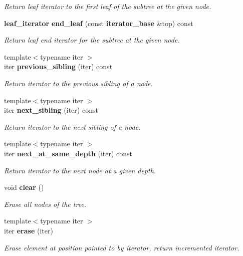 \begin{DoxyCompactItemize}
\begin{DoxyCompactList}\small\item\em Return leaf iterator to the first leaf of the subtree at the given node. \end{DoxyCompactList}\item 
{\bf leaf\+\_\+iterator} {\bf end\+\_\+leaf} (const {\bf iterator\+\_\+base} \&top) const 
\begin{DoxyCompactList}\small\item\em Return leaf end iterator for the subtree at the given node. \end{DoxyCompactList}\item 
{\footnotesize template$<$typename iter $>$ }\\iter {\bf previous\+\_\+sibling} (iter) const 
\begin{DoxyCompactList}\small\item\em Return iterator to the previous sibling of a node. \end{DoxyCompactList}\item 
{\footnotesize template$<$typename iter $>$ }\\iter {\bf next\+\_\+sibling} (iter) const 
\begin{DoxyCompactList}\small\item\em Return iterator to the next sibling of a node. \end{DoxyCompactList}\item 
{\footnotesize template$<$typename iter $>$ }\\iter {\bf next\+\_\+at\+\_\+same\+\_\+depth} (iter) const 
\begin{DoxyCompactList}\small\item\em Return iterator to the next node at a given depth. \end{DoxyCompactList}\item 
void {\bf clear} ()
\begin{DoxyCompactList}\small\item\em Erase all nodes of the tree. \end{DoxyCompactList}\item 
{\footnotesize template$<$typename iter $>$ }\\iter {\bf erase} (iter)
\begin{DoxyCompactList}\small\item\em Erase element at position pointed to by iterator, return incremented iterator. \end{DoxyCompactList}\item 

\end{DoxyCompactItemize}
